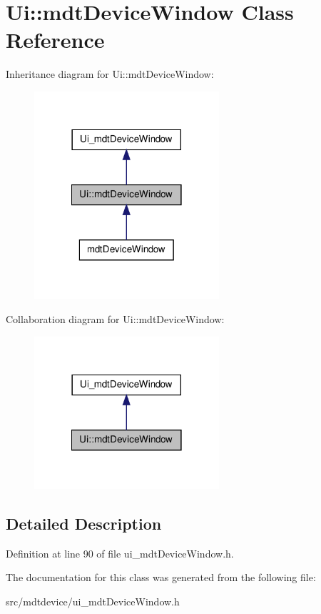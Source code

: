 \hypertarget{class_ui_1_1mdt_device_window}{
\section{Ui::mdtDeviceWindow Class Reference}
\label{class_ui_1_1mdt_device_window}
}


Inheritance diagram for Ui::mdtDeviceWindow:\nopagebreak
\begin{figure}[H]
\begin{center}
\leavevmode
\includegraphics[width=194pt]{class_ui_1_1mdt_device_window__inherit__graph}
\end{center}
\end{figure}


Collaboration diagram for Ui::mdtDeviceWindow:\nopagebreak
\begin{figure}[H]
\begin{center}
\leavevmode
\includegraphics[width=194pt]{class_ui_1_1mdt_device_window__coll__graph}
\end{center}
\end{figure}


\subsection{Detailed Description}


Definition at line 90 of file ui\_\-mdtDeviceWindow.h.



The documentation for this class was generated from the following file:\begin{DoxyCompactItemize}
\item 
src/mdtdevice/ui\_\-mdtDeviceWindow.h\end{DoxyCompactItemize}

